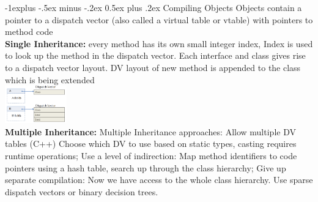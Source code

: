 \documentclass[10pt,landscape]{article}
\makeatletter
\renewcommand{\subsection}{\@startsection{subsection}{2}{0mm}%
                                {-1explus -.5ex minus -.2ex}%
                                {0.5ex plus .2ex}%
                                {\normalfont\normalsize\bfseries}}
\makeatother
\begin{document}
\begin{multicols}{3}
\subsection{Compiling Objects}
Objects contain a pointer to a dispatch vector (also called a virtual table or vtable) with pointers to method code \\
\textbf{Single Inheritance:} every method has its own small integer index, Index is used to look up the method in the dispatch vector. Each interface and class gives rise to a dispatch vector layout. DV layout of new method is appended to the class which is being extended\\
\includegraphics[width = 0.2\textwidth]{Bilder/dv_layout.png}\\
\textbf{Multiple Inheritance:} Multiple Inheritance approaches: Allow multiple DV tables (C++) Choose which DV to use based on 
static types, casting requires runtime operations; Use a level of indirection: Map method identifiers to code pointers 
using a hash table, search up through the class hierarchy; Give up separate compilation: Now we have access to the whole class hierarchy. Use sparse dispatch vectors or 
binary decision trees.

\end{multicols}
\end{document}
